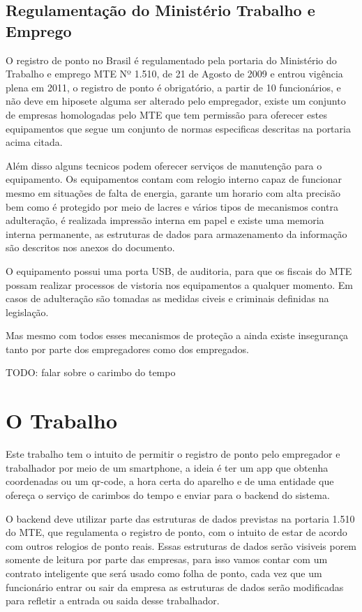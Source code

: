 \documentclass[12pt,openright,twoside,a4paper,english, brazil]{abntex2} %
\begin{document}
\subsection{Regulamentação do Ministério Trabalho e Emprego}

O registro de ponto no Brasil é regulamentado pela portaria do Ministério do Trabalho e emprego \gls{MTE} Nº 1.510, de 21 de Agosto de 2009 e entrou vigência plena em 2011, o registro de ponto é obrigatório, a partir de 10 funcionários, e não deve em hiposete alguma ser alterado pelo empregador, existe um conjunto de empresas homologadas pelo MTE que tem permissão para oferecer estes equipamentos que segue um conjunto de normas especificas descritas na portaria acima citada.

Além disso alguns tecnicos podem oferecer serviços de manutenção para o equipamento. Os equipamentos contam com relogio interno capaz de funcionar mesmo em situações de falta de energia, garante um horario com alta precisão bem como é protegido por meio de lacres e vários tipos de mecanismos contra adulteração, é realizada impressão interna em papel e existe uma memoria interna permanente, as estruturas de dados para armazenamento da informação são descritos nos anexos do documento.

O equipamento possui uma porta \gls{USB}, de auditoria, para que os fiscais do MTE possam realizar processos de vistoria nos equipamentos a qualquer momento. Em casos de adulteração são tomadas as medidas civeis e criminais definidas na legislação. 

Mas mesmo com todos esses mecanismos de proteção a ainda existe insegurança tanto por parte dos empregadores como dos empregados.

TODO: falar sobre o carimbo do tempo

\section{O Trabalho}

Este trabalho tem o intuito de permitir o registro de ponto pelo empregador e trabalhador por meio de um smartphone, a ideia é ter um app que obtenha coordenadas ou um qr-code, a hora certa do aparelho e de uma entidade que ofereça o serviço de carimbos do tempo e enviar para o backend do sistema.

O backend deve utilizar parte das estruturas de dados previstas na portaria 1.510 do MTE, que regulamenta o registro de ponto, com o intuito de estar de acordo com outros relogios de ponto reais. Essas estruturas de dados serão visiveis porem somente de leitura por parte das empresas, para isso vamos contar com um contrato inteligente que será usado como folha de ponto, cada vez que um funcionário entrar ou sair da empresa as estruturas de dados serão modificadas para refletir a entrada ou saida desse trabalhador.
\end{document}
